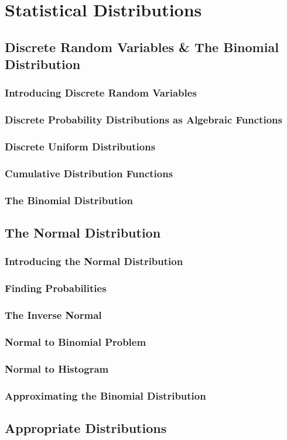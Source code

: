 \documentclass[../alevelmaths.tex]{subfiles}
\begin{document}
\chapter{Statistical Distributions}
\section{Discrete Random Variables \& The Binomial Distribution}
\subsection*{Introducing Discrete Random Variables}
\subsection*{Discrete Probability Distributions as Algebraic Functions}
\subsection*{Discrete Uniform Distributions}
\subsection*{Cumulative Distribution Functions}
\subsection*{The Binomial Distribution}
\section{The Normal Distribution}
\subsection*{Introducing the Normal Distribution}
\subsection*{Finding Probabilities}
\subsection*{The Inverse Normal}
\subsection*{Normal to Binomial Problem}
\subsection*{Normal to Histogram}
\subsection*{Approximating the Binomial Distribution}
\section{Appropriate Distributions}
\end{document}

